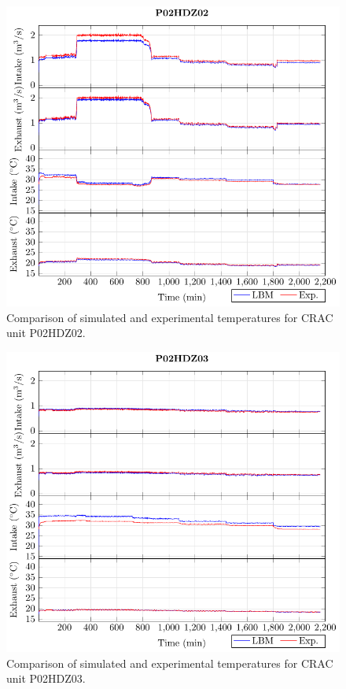 \documentclass[border=10pt,preview]{standalone}
\begin{document}
\clearpage

\begin{figure}[!htb]
\centering
\includegraphics[width=\linewidth]{Plots/P02HDZ02_T.pdf}
\caption{Comparison of simulated and experimental temperatures for CRAC unit P02HDZ02.}
\label{fig:P02HDZ02_plot}
\end{figure}

\clearpage

\begin{figure}[!htb]
\centering
\includegraphics[width=\linewidth]{Plots/P02HDZ03_T.pdf}
\caption{Comparison of simulated and experimental temperatures for CRAC unit P02HDZ03.}
\label{fig:P02HDZ03_plot}
\end{figure}
\end{document}
